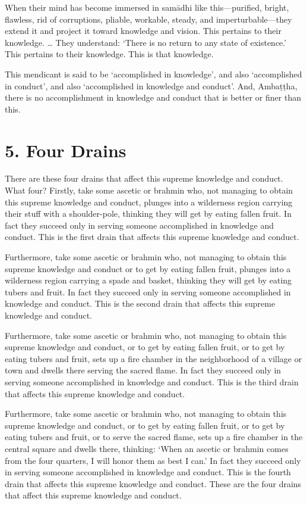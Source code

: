 \documentclass[12pt,openany]{book}%
\begin{document}
When their mind has become immersed in \textsanskrit{samādhi} like this—purified, bright, flawless, rid of corruptions, pliable, workable, steady, and imperturbable—they extend it and project it toward knowledge and vision. This pertains to their knowledge. … They understand: ‘There is no return to any state of existence.’ This pertains to their knowledge. This is that knowledge. 

This mendicant is said to be ‘accomplished in knowledge’, and also ‘accomplished in conduct’, and also ‘accomplished in knowledge and conduct’. And, \textsanskrit{Ambaṭṭha}, there is no accomplishment in knowledge and conduct that is better or finer than this. 

\section*{5. Four Drains }

There are these four drains that affect this supreme knowledge and conduct. What four? Firstly, take some ascetic or brahmin who, not managing to obtain this supreme knowledge and conduct, plunges into a wilderness region carrying their stuff with a shoulder-pole, thinking they will get by eating fallen fruit. In fact they succeed only in serving someone accomplished in knowledge and conduct. This is the first drain that affects this supreme knowledge and conduct. 

Furthermore, take some ascetic or brahmin who, not managing to obtain this supreme knowledge and conduct or to get by eating fallen fruit, plunges into a wilderness region carrying a spade and basket, thinking they will get by eating tubers and fruit. In fact they succeed only in serving someone accomplished in knowledge and conduct. This is the second drain that affects this supreme knowledge and conduct. 

Furthermore, take some ascetic or brahmin who, not managing to obtain this supreme knowledge and conduct, or to get by eating fallen fruit, or to get by eating tubers and fruit, sets up a fire chamber in the neighborhood of a village or town and dwells there serving the sacred flame. In fact they succeed only in serving someone accomplished in knowledge and conduct. This is the third drain that affects this supreme knowledge and conduct. 

Furthermore, take some ascetic or brahmin who, not managing to obtain this supreme knowledge and conduct, or to get by eating fallen fruit, or to get by eating tubers and fruit, or to serve the sacred flame, sets up a fire chamber in the central square and dwells there, thinking: ‘When an ascetic or brahmin comes from the four quarters, I will honor them as best I can.’ In fact they succeed only in serving someone accomplished in knowledge and conduct. This is the fourth drain that affects this supreme knowledge and conduct. These are the four drains that affect this supreme knowledge and conduct. 
\end{document}
